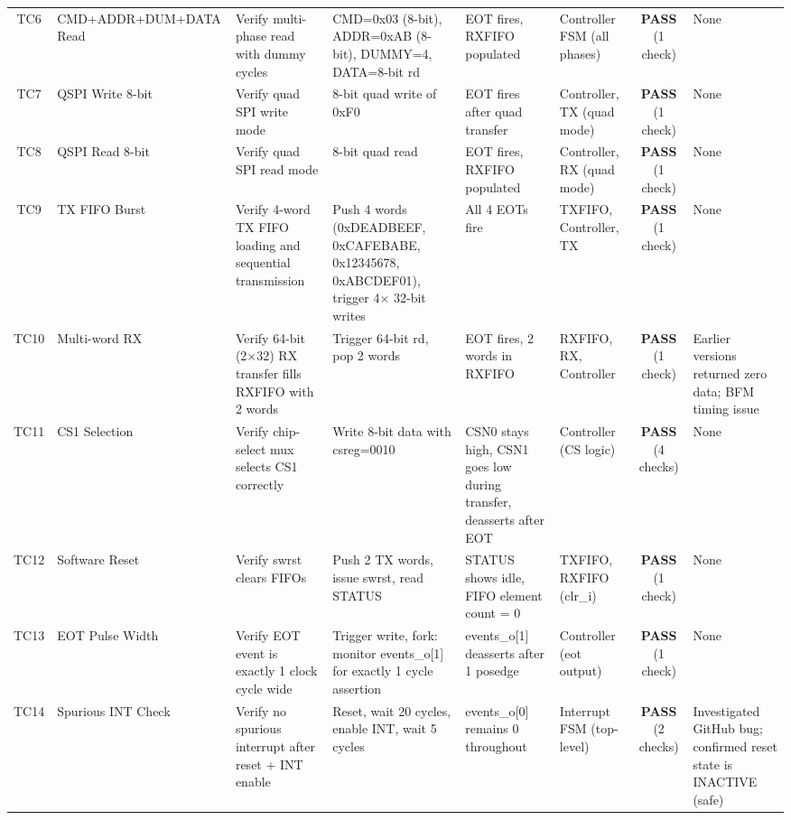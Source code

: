 \begin{landscape}
\begin{longtable}{@{}clp{3cm}p{3cm}p{2.5cm}p{2cm}cp{3cm}@{}}
TC6 & CMD+ADDR+DUM+DATA Read & Verify multi-phase read with dummy cycles & CMD=0x03 (8-bit), ADDR=0xAB (8-bit), DUMMY=4, DATA=8-bit rd & EOT fires, RXFIFO populated & Controller FSM (all phases) & \textbf{PASS} (1 check) & None \\

TC7 & QSPI Write 8-bit & Verify quad SPI write mode & 8-bit quad write of 0xF0 & EOT fires after quad transfer & Controller, TX (quad mode) & \textbf{PASS} (1 check) & None \\

TC8 & QSPI Read 8-bit & Verify quad SPI read mode & 8-bit quad read & EOT fires, RXFIFO populated & Controller, RX (quad mode) & \textbf{PASS} (1 check) & None \\

TC9 & TX FIFO Burst & Verify 4-word TX FIFO loading and sequential transmission & Push 4 words (0xDEADBEEF, 0xCAFEBABE, 0x12345678, 0xABCDEF01), trigger 4$\times$ 32-bit writes & All 4 EOTs fire & TXFIFO, Controller, TX & \textbf{PASS} (1 check) & None \\

TC10 & Multi-word RX & Verify 64-bit (2$\times$32) RX transfer fills RXFIFO with 2 words & Trigger 64-bit rd, pop 2 words & EOT fires, 2 words in RXFIFO & RXFIFO, RX, Controller & \textbf{PASS} (1 check) & Earlier versions returned zero data; BFM timing issue \\

TC11 & CS1 Selection & Verify chip-select mux selects CS1 correctly & Write 8-bit data with csreg=0010 & CSN0 stays high, CSN1 goes low during transfer, deasserts after EOT & Controller (CS logic) & \textbf{PASS} (4 checks) & None \\

TC12 & Software Reset & Verify swrst clears FIFOs & Push 2 TX words, issue swrst, read STATUS & STATUS shows idle, FIFO element count = 0 & TXFIFO, RXFIFO (clr\_i) & \textbf{PASS} (1 check) & None \\

TC13 & EOT Pulse Width & Verify EOT event is exactly 1 clock cycle wide & Trigger write, fork: monitor events\_o[1] for exactly 1 cycle assertion & events\_o[1] deasserts after 1 posedge & Controller (eot output) & \textbf{PASS} (1 check) & None \\

TC14 & Spurious INT Check & Verify no spurious interrupt after reset + INT enable & Reset, wait 20 cycles, enable INT, wait 5 cycles & events\_o[0] remains 0 throughout & Interrupt FSM (top-level) & \textbf{PASS} (2 checks) & Investigated GitHub bug; confirmed reset state is INACTIVE (safe) \\

\end{longtable}
\end{landscape}

